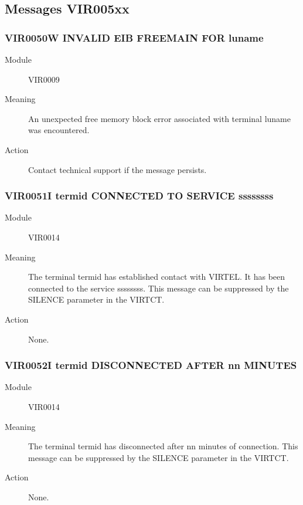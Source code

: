 \documentclass[letterpaper,10pt,english]{sphinxmanual}
\begin{document}
\subsection{Messages VIR005xx}
\label{\detokenize{messages:messages-vir005xx}}

\subsubsection{VIR0050W INVALID EIB FREEMAIN FOR luname}
\label{\detokenize{messages:vir0050w-invalid-eib-freemain-for-luname}}\begin{description}
\item[{Module}] \leavevmode
VIR0009

\item[{Meaning}] \leavevmode
An unexpected free memory block error associated with terminal luname was encountered.

\item[{Action}] \leavevmode
Contact technical support if the message persists.

\end{description}


\subsubsection{VIR0051I termid CONNECTED TO SERVICE ssssssss}
\label{\detokenize{messages:vir0051i-termid-connected-to-service-ssssssss}}\begin{description}
\item[{Module}] \leavevmode
VIR0014

\item[{Meaning}] \leavevmode
The terminal termid has established contact with VIRTEL. It has been connected to the service ssssssss. This message can be suppressed by the SILENCE parameter in the VIRTCT.

\item[{Action}] \leavevmode
None.

\end{description}


\subsubsection{VIR0052I termid DISCONNECTED AFTER nn MINUTES}
\label{\detokenize{messages:vir0052i-termid-disconnected-after-nn-minutes}}\begin{description}
\item[{Module}] \leavevmode
VIR0014

\item[{Meaning}] \leavevmode
The terminal termid has disconnected after nn minutes of connection. This message can be suppressed by the SILENCE parameter in the VIRTCT.

\item[{Action}] \leavevmode
None.

\end{description}
\end{document}

